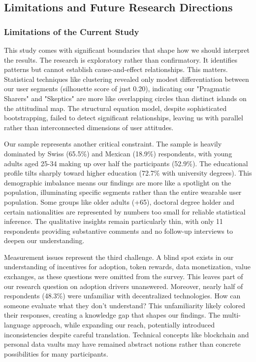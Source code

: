 \subsection{Limitations and Future Research Directions}
	\subsubsection{Limitations of the Current Study}
	This study comes with significant boundaries that shape how we should interpret the results. The research is exploratory rather than confirmatory. It identifies patterns but cannot establish cause-and-effect relationships. This matters. Statistical techniques like clustering revealed only modest differentiation between our user segments (silhouette score of just 0.20), indicating our "Pragmatic Sharers" and "Skeptics" are more like overlapping circles than distinct islands on the attitudinal map. The structural equation model, despite sophisticated bootstrapping, failed to detect significant relationships, leaving us with parallel rather than interconnected dimensions of user attitudes.
	
	Our sample represents another critical constraint. The sample is heavily dominated by Swiss (65.5\%) and Mexican (18.9\%) respondents, with young adults aged 25-34 making up over half the participants (52.9\%). The educational profile tilts sharply toward higher education (72.7\% with university degrees). This demographic imbalance means our findings are more like a spotlight on the population, illuminating specific segments rather than the entire wearable user population. Some groups like older adults (+65), doctoral degree holder and certain nationalities are represented by numbers too small for reliable statistical inference. The qualitative insights remain particularly thin, with only 11 respondents providing substantive comments and no follow-up interviews to deepen our understanding.
	
	Measurement issues represent the third challenge. A  blind spot exists in our understanding of incentives for adoption, token rewards, data monetization, value exchanges, as these questions were omitted from the survey. This leaves part of our research question on adoption drivers unanswered. Moreover, nearly half of respondents (48.3\%) were unfamiliar with decentralized technologies. How can someone evaluate what they don't understand? This unfamiliarity likely colored their responses, creating a knowledge gap that shapes our findings. The multi-language approach, while expanding our reach, potentially introduced inconsistencies despite careful translation. Technical concepts like blockchain and personal data vaults may have remained abstract notions rather than concrete possibilities for many participants.
	

